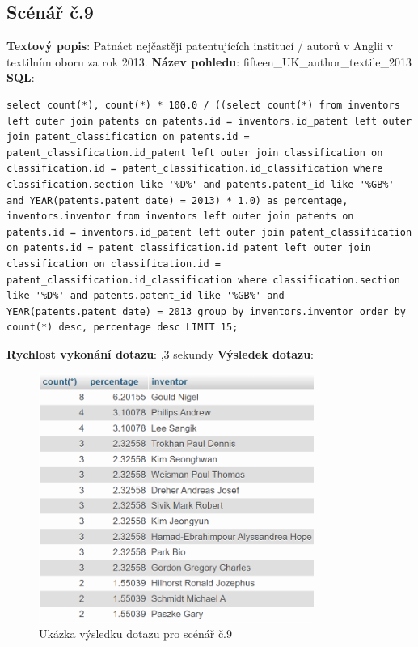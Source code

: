 \newpage
\subsection{Scénář č.9}
\textbf{Textový popis}: Patnáct nejčastěji patentujících institucí / autorů v Anglii v textilním oboru za rok 2013.
\newline
\textbf{Název pohledu}: fifteen\_UK\_author\_textile\_2013
\newline
\textbf{SQL}: 
\begin{lstlisting}[label = {lst:elements_a}]
select count(*), count(*) * 100.0 / ((select count(*) from inventors left outer join patents on patents.id = inventors.id_patent left outer join patent_classification on patents.id = patent_classification.id_patent left outer join classification on classification.id = patent_classification.id_classification where classification.section like '%D%' and patents.patent_id like '%GB%' and YEAR(patents.patent_date) = 2013) * 1.0) as percentage, inventors.inventor from inventors left outer join patents on patents.id = inventors.id_patent left outer join patent_classification on patents.id = patent_classification.id_patent left outer join classification on classification.id = patent_classification.id_classification where classification.section like '%D%' and patents.patent_id like '%GB%' and YEAR(patents.patent_date) = 2013 group by inventors.inventor order by count(*) desc, percentage desc LIMIT 15;
\end{lstlisting}
\textbf{Rychlost vykonání dotazu}: ,3 sekundy
\newline
\textbf{Výsledek dotazu}:
\begin{figure}[H]
\centering
\includegraphics[width=9cm]{img/scenare/scenar_9}
\caption{Ukázka výsledku dotazu pro scénář č.9}
\label{fig:scenar9}
\end{figure}